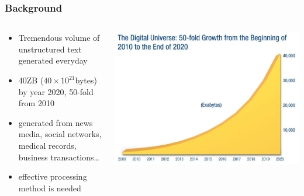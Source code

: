 \documentclass{beamer}
\begin{document}
\begin{frame}
\frametitle{Background}
    \begin{columns}
    \begin{column}{0.5\textwidth}
    \begin{itemize}
        \item Tremendous volume of unstructured text generated everyday
        \item 40ZB ($40\times 10^{21}$bytes) by year 2020, 50-fold from 2010\footnotemark
        \item generated from news media, social networks, medical records, 
            business transactions\ldots
        \item effective processing method is needed
    \end{itemize}
    \end{column}
    \begin{column}{0.5\textwidth}
    \center\includegraphics[width=\textwidth]{figure/data_growth_2020}
    \end{column}
    \end{columns}
\end{frame}
\end{document}
